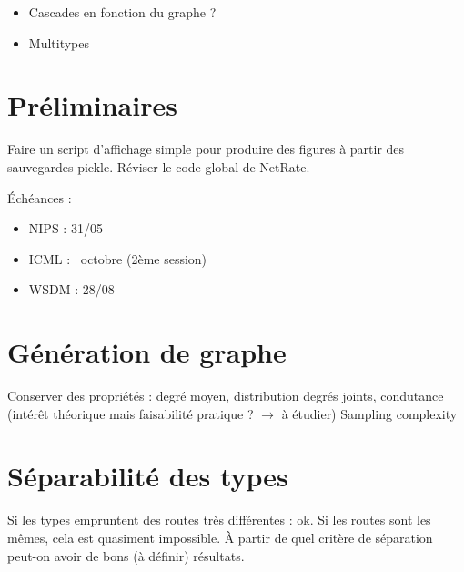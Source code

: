 \documentclass[a4paper]{article}
\begin{document}
\begin{itemize}
    \item Cascades en fonction du graphe ?
    \item Multitypes
\end{itemize}

\section*{Préliminaires}
\label{sec:preliminaires}

Faire un script d'affichage simple pour produire des figures à partir des
sauvegardes pickle. Réviser le code global de NetRate.

Échéances :
\begin{itemize}
    \item NIPS : 31/05
    \item ICML : ~octobre (2ème session)
    \item WSDM : 28/08
\end{itemize}

\section{Génération de graphe}
\label{sec:generation_graphe}

Conserver des propriétés : degré moyen, distribution degrés joints, condutance
(intérêt théorique mais faisabilité pratique ? $\rightarrow$ à étudier)
Sampling complexity

\section{Séparabilité des types}
\label{sec:separabilite_types}

Si les types empruntent des routes très différentes : ok. Si les routes sont
les mêmes, cela est quasiment impossible. À partir de quel critère de
séparation peut-on avoir de bons (à définir) résultats.
\end{document}
